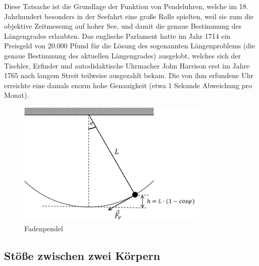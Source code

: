 Diese Tatsache ist die Grundlage der Funktion von Pendeluhren, welche im 18. Jahrhundert besonders in der Seefahrt eine große Rolle spielten, weil sie zum die objektive Zeitmessung auf hoher See, und damit die genaue Bestimmung des Längengrades erlaubten. Das englische Parlament hatte im Jahr 1714 ein Preisgeld von 20.000 Pfund für die Lösung des sogenannten Längenproblems (die genaue Bestimmung des aktuellen Längengrades) ausgelobt, welches sich der Tischler, Erfinder und autodidaktische Uhrmacher John Harrison erst im Jahre 1765 nach langem Streit teilweise ausgezahlt bekam. Die von ihm erfundene Uhr erreichte eine damals enorm hohe Genauigkeit (etwa 1 Sekunde Abweichung pro Monat).
%
\begin{figure}[hb]
	\centering
		\includegraphics[height=6cm]{Abbildungen/Fadenpendel.jpg}
	\caption{Fadenpendel}
	\label{fig:Fadenpendel}
\end{figure}

\subsection{Stöße zwischen zwei Körpern}

